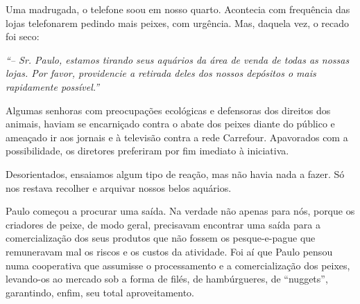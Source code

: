 Uma madrugada, o telefone soou em nosso quarto.
Acontecia com frequência das lojas telefonarem pedindo mais peixes, com urgência.
Mas, daquela vez, o recado foi seco:

\textit{``-- Sr. Paulo, estamos tirando seus aquários da área de venda de todas as nossas lojas.
Por favor, providencie a retirada deles dos nossos depósitos o mais rapidamente possível.''}

Algumas senhoras com preocupações ecológicas e defensoras dos direitos dos animais, haviam se encarniçado contra o abate dos peixes diante do público e ameaçado ir aos jornais e à televisão contra a rede Carrefour.
Apavorados com a possibilidade, os diretores preferiram por fim imediato à iniciativa.

Desorientados, ensaiamos algum tipo de reação, mas não havia nada a fazer.
Só nos restava recolher e arquivar nossos belos aquários.

Paulo começou a procurar uma saída.
Na verdade não apenas para nós, porque os criadores de peixe, de modo geral, precisavam encontrar uma saída para a comercialização dos seus produtos que não fossem os pesque-e-pague que remuneravam mal os riscos e os custos da atividade.
Foi aí que Paulo pensou numa cooperativa que assumisse o processamento e a comercialização dos peixes, levando-os ao mercado sob a forma de filés, de hambúrgueres, de ``nuggets'', garantindo, enfim, seu total aproveitamento.

